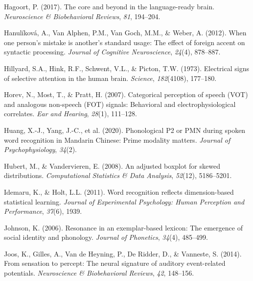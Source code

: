 \documentclass[
  12pt,
  twoside]{article}
\newlength{\cslhangindent}
\newlength{\cslentryspacingunit} %
\newenvironment{CSLReferences}[2] %
 {%
  \setlength{\parindent}{0pt}
  \ifodd #1
  \let\oldpar\par
  \def\par{\hangindent=\cslhangindent\oldpar}
  \fi
  \setlength{\parskip}{#2\cslentryspacingunit}
 }%
 {}
\begin{document}
\begin{CSLReferences}{1}{0}
\leavevmode{}%
Hagoort, P. (2017). The core and beyond in the language-ready brain. \emph{Neuroscience \& Biobehavioral Reviews}, \emph{81}, 194--204.

\leavevmode{}%
Hanulíková, A., Van Alphen, P.M., Van Goch, M.M., \& Weber, A. (2012). When one person's mistake is another's standard usage: The effect of foreign accent on syntactic processing. \emph{Journal of Cognitive Neuroscience}, \emph{24}(4), 878--887.

\leavevmode{}%
Hillyard, S.A., Hink, R.F., Schwent, V.L., \& Picton, T.W. (1973). Electrical signs of selective attention in the human brain. \emph{Science}, \emph{182}(4108), 177--180.

\leavevmode{}%
Horev, N., Most, T., \& Pratt, H. (2007). Categorical perception of speech ({VOT}) and analogous non-speech ({FOT}) signals: Behavioral and electrophysiological correlates. \emph{Ear and Hearing}, \emph{28}(1), 111--128.

\leavevmode{}%
Huang, X.-J., Yang, J.-C., et al. (2020). Phonological {P2 or PMN} during spoken word recognition in {Mandarin Chinese}: Prime modality matters. \emph{Journal of Psychophysiology}, \emph{34}(2).

\leavevmode{}%
Hubert, M., \& Vandervieren, E. (2008). An adjusted boxplot for skewed distributions. \emph{Computational Statistics \& Data Analysis}, \emph{52}(12), 5186--5201.

\leavevmode{}%
Idemaru, K., \& Holt, L.L. (2011). Word recognition reflects dimension-based statistical learning. \emph{Journal of Experimental Psychology: Human Perception and Performance}, \emph{37}(6), 1939.

\leavevmode{}%
Johnson, K. (2006). Resonance in an exemplar-based lexicon: The emergence of social identity and phonology. \emph{Journal of Phonetics}, \emph{34}(4), 485--499.

\leavevmode{}%
Joos, K., Gilles, A., Van de Heyning, P., De Ridder, D., \& Vanneste, S. (2014). From sensation to percept: The neural signature of auditory event-related potentials. \emph{Neuroscience \& Biobehavioral Reviews}, \emph{42}, 148--156.


\end{CSLReferences}
\end{document}

